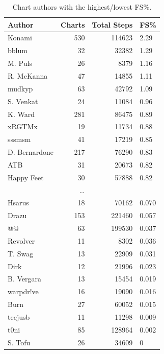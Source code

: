 \documentclass[10pt]{sigplanconf}
\begin{document}
\begin{table}[p]
	\begin{center}
		\small
	\begin{tabular}{l|r|r|l}
		\bf Author & \bf Charts & \bf Total Steps & \bf FS\% \\
		\hline
		Konami        & 530 & 114623 & 2.29 \\
		bblum         &  32 &  32382 & 1.29 \\
		M. Puls       &  26 &   8379 & 1.16 \\
		R. McKanna    &  47 &  14855 & 1.11 \\
		mudkyp        &  63 &  42792 & 1.09 \\
		S. Venkat     &  24 &  11084 & 0.96 \\
		K. Ward       & 281 &  86475 & 0.89 \\
		xRGTMx        &  19 &  11734 & 0.88 \\
		sssmsm        &  41 &  17219 & 0.85 \\
		D. Bernardone & 217 &  76290 & 0.83 \\
		ATB           &  31 &  20673 & 0.82 \\
		Happy Feet    &  30 &  57888 & 0.82 \\
		\multicolumn{4}{c}{\normalsize\dots} \\
		Hsarus        &  18 &  70162 & 0.070 \\
		Drazu         & 153 & 221460 & 0.057 \\
		@@            &  63 & 199530 & 0.037 \\
		Revolver      &  11 &   8302 & 0.036 \\
		T. Swag       &  13 &  22909 & 0.031 \\
		Dirk          &  12 &  21996 & 0.023 \\
		B. Vergara    &  13 &  15454 & 0.019 \\
		warpdr!ve     &  16 &  19090 & 0.016 \\
		Burn          &  27 &  60052 & 0.015 \\
		teejusb       &  11 &  11298 & 0.009 \\
		t0ni          &  85 & 128964 & 0.002 \\
		S. Tofu       &  26 &  34609 & 0
	\end{tabular}
	\end{center}
	\caption{Chart authors with the highest/lowest FS\%.}
	\label{tab:author-fs}
\end{table}
\end{document}
